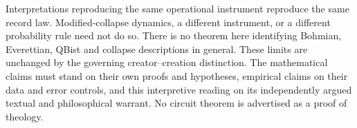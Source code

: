 Interpretations reproducing the same operational instrument reproduce the same record law. Modified-collapse dynamics, a different instrument, or a different probability rule need not do so. There is no theorem here identifying Bohmian, Everettian, QBist and collapse descriptions in general. These limits are unchanged by the governing creator--creation distinction. The mathematical claims must stand on their own proofs and hypotheses, empirical claims on their data and error controls, and this interpretive reading on its independently argued textual and philosophical warrant. No circuit theorem is advertised as a proof of theology.
